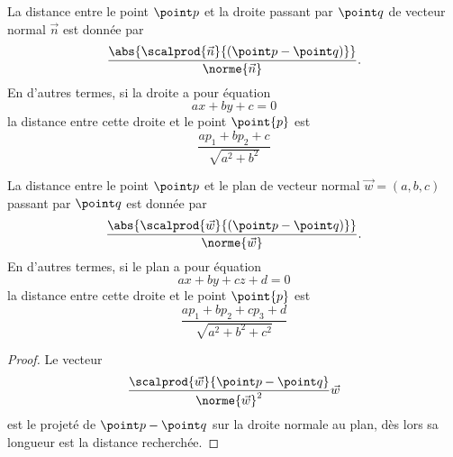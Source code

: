 \documentclass[french,xcolor=svgnames]{beamer}
\begin{document}
\begin{frame}
  \begin{proposition}
  La distance entre le point \(\point p\) et la droite passant par \(\point q\) de vecteur normal \(\vec n\) est donnée par
  \begin{equation*}
    \frac{\abs{\scalprod {\vec n} {(\point p - \point q)}}}{\norme {\vec n}}.
  \end{equation*}\pause
  En d'autres termes, si la droite a pour équation
  \begin{equation*}
    a x + b y + c = 0
  \end{equation*}
  la distance entre cette droite et le point \(\point{p}\) est
  \begin{equation*}
    \frac{a p_{1} + b p_{2} + c}{\sqrt{a^{2} + b^{2}}}
  \end{equation*}
\end{proposition}

\end{frame}
\begin{frame}
\begin{proposition}
  La distance entre le point \(\point p\) et le plan de vecteur normal \(\vec w = (a,b,c)\) passant par \(\point q\) est donnée par
  \begin{equation*}
    \frac{\abs{\scalprod {\vec w} {(\point p - \point q)}}}{\norme {\vec w}}.
  \end{equation*}\pause
  En d'autres termes, si le plan a pour équation
  \begin{equation*}
    a x + b y + c z + d = 0
  \end{equation*}
  la distance entre cette droite et le point \(\point{p}\) est
  \begin{equation*}
    \frac{a p_{1} + b p_{2} + c p_{3} + d}{\sqrt{a^{2} + b^{2} + c^{2}}}
  \end{equation*}
\end{proposition}
\begin{proof}
  Le vecteur
  \begin{equation*}
    \frac{\scalprod {\vec w} {\point p - \point q}}{\norme {\vec w}^{2}}\vec w
  \end{equation*}
  est le projeté de \(\point p - \point q\) sur la droite normale au plan, dès lors sa longueur est la distance recherchée.
\end{proof}
\end{frame}
\end{document}
